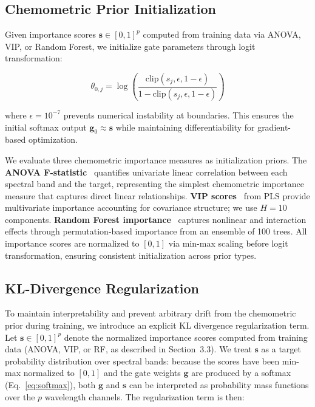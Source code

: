 \documentclass[preprint,12pt]{elsarticle}
\begin{document}
\subsection{Chemometric Prior Initialization}

Given importance scores $\mathbf{s} \in [0,1]^p$ computed from training data via ANOVA, VIP, or Random Forest, we initialize gate parameters through logit transformation:

\begin{equation}
\theta_{0,j} = \log\left(\frac{\text{clip}(s_j, \epsilon, 1-\epsilon)}{1 - \text{clip}(s_j, \epsilon, 1-\epsilon)}\right)
\label{eq:logit}
\end{equation}

\noindent where $\epsilon=10^{-7}$ prevents numerical instability at boundaries. This ensures the initial softmax output $\mathbf{g}_0 \approx \mathbf{s}$ while maintaining differentiability for gradient-based optimization.

We evaluate three chemometric importance measures as initialization priors. The \textbf{ANOVA F-statistic}~\cite{wold1993pls} quantifies univariate linear correlation between each spectral band and the target, representing the simplest chemometric importance measure that captures direct linear relationships. \textbf{VIP scores}~\cite{chong2005performance} from PLS  provide multivariate importance accounting for covariance structure; we use $H=10$ components. \textbf{Random Forest importance}~\cite{breiman2001random} captures nonlinear and interaction effects through permutation-based importance from an ensemble of 100 trees. All importance scores are normalized to $[0,1]$ via min-max scaling before logit transformation, ensuring consistent initialization across prior types.

\subsection{KL-Divergence Regularization}

To maintain interpretability and prevent arbitrary drift from the chemometric prior during training, we introduce an explicit KL divergence regularization term. Let $\mathbf{s} \in [0,1]^p$ denote the normalized importance scores computed from training data (ANOVA, VIP, or RF, as described in Section~3.3). We treat $\mathbf{s}$ as a target probability distribution over spectral bands: because the scores have been min-max normalized to $[0,1]$ and the gate weights $\mathbf{g}$ are produced by a softmax (Eq.~\ref{eq:softmax}), both $\mathbf{g}$ and $\mathbf{s}$ can be interpreted as probability mass functions over the $p$ wavelength channels. The regularization term is then:
\end{document}
